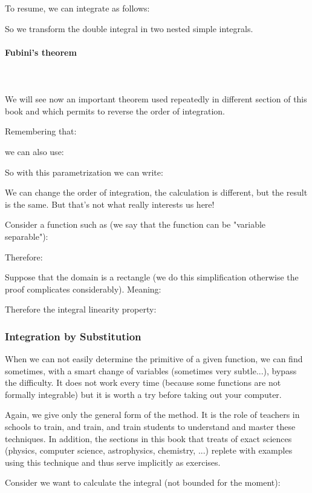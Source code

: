 	
	To resume, we can integrate as follows:
	
	So we transform the double integral in two nested simple integrals.
	
	\paragraph{Fubini's theorem}\label{fubini theorem}\mbox{}\\\\
	We will see now an important theorem used repeatedly in different section of this book and which permits to reverse the order of integration.
	
	Remembering that:
	
	we can also use:
	
	So with this parametrization we can write:
	
	We can change the order of integration, the calculation is different, but the result is the same. But that's not what really interests us here!
	
	Consider a function such as (we say that the function can be "variable separable"):
	
	Therefore:
	
	Suppose that the domain is a rectangle (we do this simplification otherwise the proof complicates considerably). Meaning:
	
	Therefore the integral linearity property:
	
	
	\subsubsection{Integration by Substitution}
	When we can not easily determine the primitive of a given function, we can find sometimes, with a smart change of variables (sometimes very subtle...), bypass the difficulty. It does not work every time (because some functions are not formally integrable) but it is worth a try before taking out your computer.
	
	Again, we give only the general form of the method. It is the role of teachers in schools to train, and train, and train students to understand and master these techniques. In addition, the sections in this book that treats of exact sciences (physics, computer science, astrophysics, chemistry, ...) replete with examples using this technique and thus serve implicitly as exercises.
	
	Consider we want to calculate the integral (not bounded for the moment):
	
